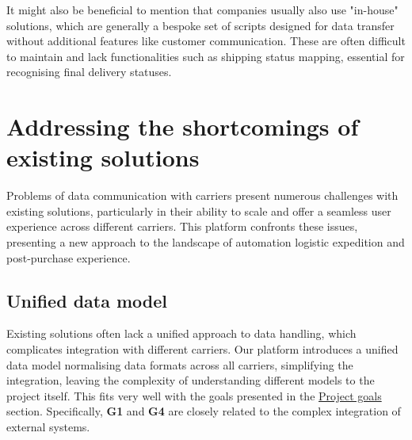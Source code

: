 
It might also be beneficial to mention that companies usually also use "in-house" solutions, which are generally a bespoke set of scripts designed for data transfer without additional features like customer communication. 
These are often difficult to maintain and lack functionalities such as shipping status mapping, essential for recognising final delivery statuses.


\section{Addressing the shortcomings of existing solutions}
\label{sec:addressing-shortcoming-existing-solutions}

Problems of data communication with carriers present numerous challenges with existing solutions, particularly in their ability to scale and offer a seamless user experience across different carriers.
This platform confronts these issues, presenting a new approach to the landscape of automation logistic expedition and post-purchase experience.

\subsection{Unified data model}
Existing solutions often lack a unified approach to data handling, which complicates integration with different carriers. 
Our platform introduces a unified data model normalising data formats across all carriers, simplifying the integration, leaving the complexity of understanding different models to the project itself.
This fits very well with the goals presented in the \hyperref[subsec:project-goals]{Project goals} section.
Specifically, \textbf{G1} and \textbf{G4} are closely related to the complex integration of external systems.

